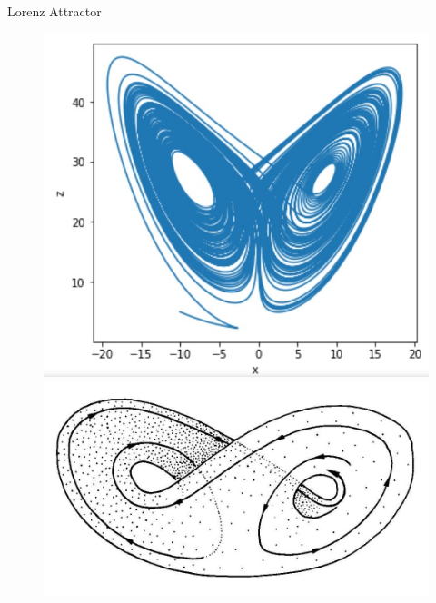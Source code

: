 \documentclass[10pt,xcolor={table,dvipsnames},t]{beamer}
\begin{document}
	\begin{frame}{Lorenz Attractor}
		
		\begin{figure}[h]
			\begin{minipage}[c]{.46\linewidth}
				\centering
				\includegraphics[width=\textwidth]{images/butterfly.jpg}
			\end{minipage}
			\hfill
			\begin{minipage}[c]{.46\linewidth}
				\centering
				\includegraphics[width=\textwidth]{images/butterfly3D.jpg}
			\end{minipage}
		\end{figure}
		
	\end{frame}
	
\end{document}
